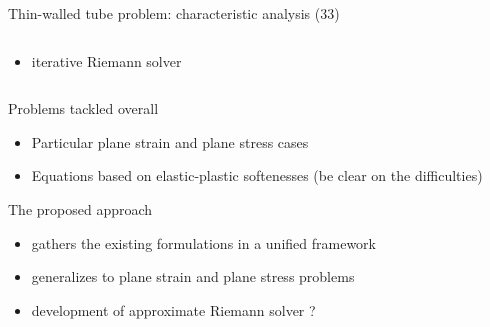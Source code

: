 \begin{frame}{Thin-walled tube problem: characteristic analysis (33)}
\begin{footnotesize}
\begin{columns}
\begin{column}{0.6\textwidth}
\begin{itemize}
\begin{itemize}
          \item \footnotesize iterative Riemann solver \cite{Lin_et_Ballman}
          \end{itemize}
        \end{itemize}
      \end{column}
      \begin{column}{0.43\textwidth}
        \vskip 5pt
        \centering
        
      \end{column}
    \end{columns}
  \end{footnotesize}
\end{frame}

\begin{frame}
  \begin{block}{Problems tackled overall}
    \begin{itemize}
    \item Particular plane strain and plane stress cases \cite{Bleich,Ting69,Ting73,Li_planeStress_EP}
    \item Equations based on elastic-plastic softenesses (be clear on the difficulties)
    
    \end{itemize}
  \end{block}
  \begin{block}{The proposed approach}
    \begin{itemize}
    \item gathers the existing formulations in a unified framework
    \item generalizes to plane strain and plane stress problems
    \item development of approximate Riemann solver ?
    \end{itemize}
  \end{block}
\end{frame}

